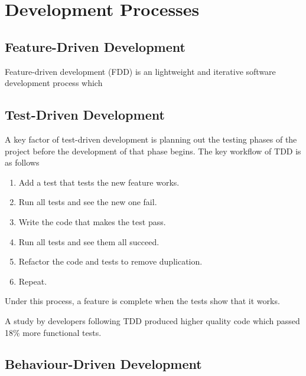 \section{Development Processes}

\subsection{Feature-Driven Development}
Feature-driven development (FDD) is an lightweight and iterative software development process which 

\subsection{Test-Driven Development}
A key factor of test-driven development is planning out the testing phases of the project before the development of that phase begins.
The key workflow of TDD is as follows \citep{Beck:2002:TDD:579193}
\begin{enumerate}
	\item Add a test that tests the new feature works.
	\item Run all tests and see the new one fail.
	\item Write the code that makes the test pass.
	\item Run all tests and see them all succeed.
	\item Refactor the code and tests to remove duplication.
	\item Repeat.
\end{enumerate}

Under this process, a feature is complete when the tests show that it works.

A study by \cite{George:2003:IIT:952532.952753} developers following TDD produced higher quality code which passed 18\% more functional tests.



\subsection{Behaviour-Driven Development}


